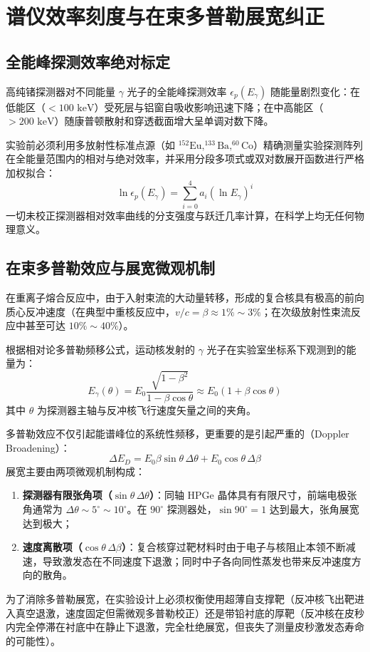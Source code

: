 \section{谱仪效率刻度与在束多普勒展宽纠正}
\label{sec:efficiency_and_doppler}

\subsection{全能峰探测效率绝对标定}

高纯锗探测器对不同能量 $\gamma$ 光子的全能峰探测效率 $\epsilon_p(E_\gamma)$ 随能量剧烈变化：在低能区（$< 100\text{ keV}$）受死层与铝窗自吸收影响迅速下降；在中高能区（$> 200\text{ keV}$）随康普顿散射和穿透截面增大呈单调对数下降。

实验前必须利用多放射性标准点源（如 $^{152}\text{Eu}, ^{133}\text{Ba}, ^{60}\text{Co}$）精确测量实验探测阵列在全能量范围内的相对与绝对效率，并采用分段多项式或双对数展开函数进行严格加权拟合：
\begin{equation}
    \ln \epsilon_p(E_\gamma) = \sum_{i=0}^4 a_i (\ln E_\gamma)^i
\end{equation}
一切未校正探测器相对效率曲线的分支强度与跃迁几率计算，在科学上均无任何物理意义。

\subsection{在束多普勒效应与展宽微观机制}

在重离子熔合反应中，由于入射束流的大动量转移，形成的复合核具有极高的前向质心反冲速度（在典型中重核反应中，$v/c = \beta \approx 1\% \sim 3\%$；在次级放射性束流反应中甚至可达 $10\%\sim 40\%$）。

根据相对论多普勒频移公式，运动核发射的 $\gamma$ 光子在实验室坐标系下观测到的能量为：
\begin{equation}
    E_\gamma(\theta) = E_0 \frac{\sqrt{1 - \beta^2}}{1 - \beta \cos\theta} \approx E_0 (1 + \beta \cos\theta)
    \label{eq:doppler_shift}
\end{equation}
其中 $\theta$ 为探测器主轴与反冲核飞行速度矢量之间的夹角。

多普勒效应不仅引起能谱峰位的系统性频移，更重要的是引起严重的（Doppler Broadening）：
\begin{equation}
    \Delta E_D = E_0 \beta \sin\theta \, \Delta\theta + E_0 \cos\theta \, \Delta\beta
    \label{eq:doppler_broadening}
\end{equation}
展宽主要由两项微观机制构成：
\begin{enumerate}
    \item \textbf{探测器有限张角项（$\sin\theta \, \Delta\theta$）}：同轴 HPGe 晶体具有有限尺寸，前端电极张角通常为 $\Delta\theta \sim 5^\circ \sim 10^\circ$。在 $90^\circ$ 探测器处，$\sin 90^\circ = 1$ 达到最大，张角展宽达到极大；
    \item \textbf{速度离散项（$\cos\theta \, \Delta\beta$）}：复合核穿过靶材料时由于电子与核阻止本领不断减速，导致激发态在不同速度下退激；同时中子各向同性蒸发也带来反冲速度方向的散角。
\end{enumerate}
为了消除多普勒展宽，在实验设计上必须权衡使用超薄自支撑靶（反冲核飞出靶进入真空退激，速度固定但需微观多普勒校正）还是带铅衬底的厚靶（反冲核在皮秒内完全停滞在衬底中在静止下退激，完全杜绝展宽，但丧失了测量皮秒激发态寿命的可能性）。
